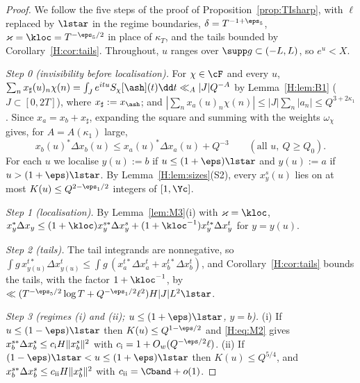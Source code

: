 \begin{proof}
We follow the five steps of the proof of Proposition~\ref{prop:TIsharp}, with $\ell$ replaced by $\lstar$ in the regime boundaries, $\delta=T^{-1+\eps_5}$, $\varkappa=\kloc=T^{-\eps_5/2}$ in place of $\kappa_T$, and the tails bounded by Corollary~\ref{H:cor:tails}. Throughout, $u$ ranges over $\supp g\subset(-L,L)$, so $e^u<X$.

\emph{Step 0 (invisibility before localisation).} For $\chi\in\cF$ and every $u$, $\sum_nx_\sharp(u)_n\chi(n)=\int_Je^{itu}S_\chi[\ash](t)\dd t\ll_A|J|Q^{-A}$ by Lemma~\ref{H:lem:B1} ($J\subset[0,2T]$), where $x_\sharp:=x_{\ash}$; and $|\sum_nx_a(u)_n\chi(n)|\le|J|\sum_n|a_n|\le Q^{3+2\kappa_1}$. Since $x_a=x_b+x_\sharp$, expanding the square and summing with the weights $\omega_\chi$ gives, for $A=A(\kappa_1)$ large,
\begin{equation}\label{H:eq:step0}
x_b(u)^*\Delta x_b(u)\le x_a(u)^*\Delta x_a(u)+Q^{-3}\qquad(\text{all }u,\ Q\ge Q_0).
\end{equation}
For each $u$ we localise $y(u):=b$ if $u\le(1+\eps)\lstar$ and $y(u):=a$ if $u>(1+\eps)\lstar$. By Lemma~\ref{H:lem:sizes}(S2), every $x^s_y(u)$ lies on at most $K(u)\le Q^{2-\eps_1/2}$ integers of $[1,\Yc]$.

\emph{Step 1 (localisation).} By Lemma~\ref{lem:M3}(i) with $\varkappa=\kloc$, $x_y^*\Delta x_y\le(1+\kloc)x_y^{s*}\Delta x^s_y+(1+\kloc^{-1})x_y^{t*}\Delta x_y^t$ for $y=y(u)$.

\emph{Step 2 (tails).} The tail integrands are nonnegative, so $\int g\,x_{y(u)}^{t*}\Delta x^t_{y(u)}\le\int g\,(x_a^{t*}\Delta x_a^t+x_b^{t*}\Delta x_b^t)$, and Corollary~\ref{H:cor:tails} bounds the tails, with the factor $1+\kloc^{-1}$, by $\ll(T^{-\eps_5/2}\log T+Q^{-\eps_1/2}\ell^2)H|J|L^2\lstar$.

\emph{Step 3 (regimes (i) and (ii); $u\le(1+\eps)\lstar$, $y=b$).} (i) If $u\le(1-\eps)\lstar$ then $K(u)\le Q^{1-\eps/2}$ and \eqref{H:eq:M2} gives $x_b^{s*}\Delta x_b^s\le c_{\rm i}H\|x_b^s\|^2$ with $c_{\rm i}=1+O_w(Q^{-\eps/2}\ell)$. (ii) If $(1-\eps)\lstar<u\le(1+\eps)\lstar$ then $K(u)\le Q^{5/4}$, and $x_b^{s*}\Delta x_b^s\le c_{\rm ii}H\|x_b^s\|^2$ with $c_{\rm ii}=\Cband+o(1)$.


\end{proof}
